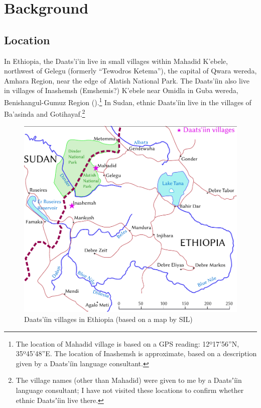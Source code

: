 \documentclass[output=paper]{langsci/langscibook}
\begin{document}
\section{Background}\label{sec:ahlandc:2}

\subsection{Location}\label{sec:ahlandc:2.1}

In Ethiopia, the Daats’i\'{ }in live in small villages within Mahadid K’ebele, northwest of Gelegu (formerly “Tewodros Ketema”), the capital of Qwara wereda, Amhara Region, near the edge of Alatish National Park. The Daats'íin also live in villages of Inashemsh (Emshemis?) K’ebele near Omidla in Guba wereda, Benishangul-Gumuz Region ().\footnote{The location of Mahadid village is based on a GPS reading: 12º17'56''N, 35º45'48''E.  The location of Inashemsh is approximate, based on a description given by a Daats’íin language consultant.} In Sudan, ethnic Daats’íin live in the villages of Ba’asinda and Gotihayaf.\footnote{The village names (other than Mahadid) were given to me by a Daatsʼíin language consultant; I have not visited these locations to confirm whether ethnic Daatsʼíin live there. }

 
\begin{figure}
\includegraphics[width=\textwidth]{figures/AhlandCDaatsiin.pdf}
\caption{Daats’íin villages in Ethiopia (based on a map by SIL)}
\label{fig:ahlandc:1}
\end{figure}
\end{document}

